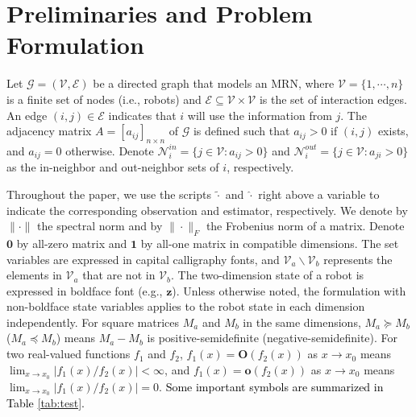 \documentclass[12pt,journal,draftclsnofoot,onecolumn]{IEEEtran}
\begin{document}
\section{Preliminaries and Problem Formulation}\label{preliminary}
Let $\mathcal{G}=(\mathcal{V},\mathcal{E})$ be a directed graph that models an MRN, where $\mathcal{V}=\{1, \cdots,n\}$ is a finite set of nodes (i.e., robots) and $\mathcal{E}\subseteq \mathcal{V}\times \mathcal{V}$ is the set of interaction edges. 
An edge $(i,j)\in \mathcal{E}$ indicates that $i$ will use the information from $j$. 
The adjacency matrix $A=[a_{ij}]_{n \times n}$ of $\mathcal{G}$ is defined such that ${a}_{ij}\!>\!0$ if $(i,j)$ exists, and ${a}_{ij}\!=\!0$ otherwise. 
Denote ${\mathcal{N}_i^{in}}=\{j\in \mathcal{V}:a_{ij}>0\}$ and ${\mathcal{N}_i^{out}}=\{j\in \mathcal{V}:a_{ji}>0\}$ as the in-neighbor and  out-neighbor sets of $i$, respectively. 

Throughout the paper, we use the scripts $\tilde \cdot $ and  $\hat \cdot$ right above a variable to indicate the corresponding observation and estimator, respectively. 
We denote by $\| \cdot \|$ the spectral norm and by $\| \cdot \|_{F}$ the Frobenius norm of a matrix. 
Denote $\bm{0}$ by all-zero matrix and $\bm{1}$ by all-one matrix in compatible dimensions. 
The set variables are expressed in capital calligraphy fonts, and $\mathcal{V}_a \backslash \mathcal{V}_b$ represents the elements in $\mathcal{V}_a$ that are not in $\mathcal{V}_b$. 
The two-dimension state of a robot is expressed in boldface font (e.g., ${\mathbf z}$). 
Unless otherwise noted, the formulation with non-boldface state variables applies to the robot state in each dimension independently. 
For square matrices $M_a$ and $M_b$ in the same dimensions, ${M_a}\!\succeq\!{M_b}$ (${M_a}\!\preceq\!{M_b}$) means ${M_a}-{M_b}$ is positive-semidefinite (negative-semidefinite). 
For two real-valued functions $f_1$ and $f_2$, $f_1(x)=\bm{O}(f_2(x))$ as $x\to x_0$ means $\mathop {\lim }\nolimits_{x \to x_0 } |f_1(x)/f_2(x)|<\infty$, and $f_1(x)=\bm{o}(f_2(x))$ as $x\to x_0$ means $\mathop {\lim }\nolimits_{x \to x_0 } |f_1(x)/f_2(x)|=0$. 
\textcolor{black}{Some important symbols are summarized in Table \ref{tab:test}. }
\end{document}
